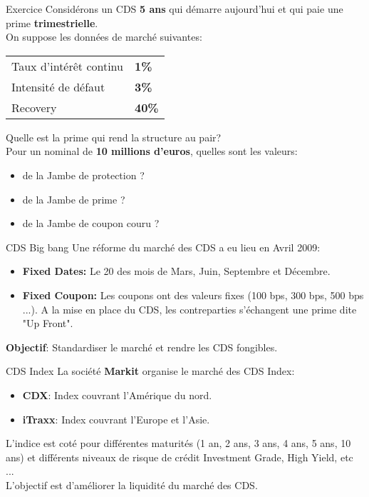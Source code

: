 \documentclass{beamer}
\begin{document}
\begin{frame}{Exercice}
Considérons un CDS \textbf{5 ans} qui démarre aujourd'hui et qui paie une prime \textbf{trimestrielle}.\\
\vspace{0.5cm}
On suppose les données de marché suivantes:\\
\begin{center}
\begin{tabular}{|l|l|}
\hline
Taux d'intérêt continu&\textbf{1\%}\\
Intensité de défaut&\textbf{3\%}\\
Recovery&\textbf{40\%}\\
\hline
\end{tabular}
\end{center}
Quelle est la prime qui rend la structure au pair?\\
Pour un nominal de \textbf{10 millions d'euros}, quelles sont les valeurs:\\
\begin{itemize}
\item de la Jambe de protection ?\\
\item de la Jambe de prime ? \\
\item de la Jambe de coupon couru ?\\
\end{itemize}
\end{frame}

\begin{frame}{CDS Big bang}
Une réforme du marché des CDS a eu lieu en Avril 2009:\\
\vspace{0.5cm}
\begin{itemize}
\item \textbf{Fixed Dates:} Le 20 des mois de Mars, Juin, Septembre et Décembre.
\item \textbf{Fixed Coupon:} Les coupons ont des valeurs fixes (100 bps, 300 bps, 500 bps ...). A la mise en place du CDS, les contreparties s'échangent une prime dite "Up Front".
\end{itemize}
\vspace{0.5cm}
\textbf{Objectif}: Standardiser le marché et rendre les CDS fongibles.
\end{frame}

\begin{frame}{CDS Index}
La société \textbf{Markit} organise le marché des CDS Index:\\
\begin{itemize}
\item \textbf{CDX}: Index couvrant l'Amérique du nord.
\item \textbf{iTraxx}: Index couvrant l'Europe et l'Asie.
\end{itemize}
\vspace{0.5cm}
L'indice est coté pour différentes maturités (1 an, 2 ans, 3 ans, 4 ans, 5 ans, 10 ans) et différents niveaux de risque de crédit Investment Grade, High Yield, etc ...\\
\vspace{0.5cm}
L'objectif est d'améliorer la liquidité du marché des CDS.
\end{frame}
\end{document}
